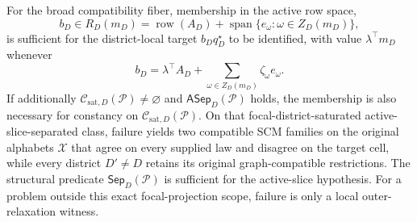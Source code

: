 For the broad compatibility fiber, membership in the active row space,
\[
b_D\in R_D(m_D)
=\operatorname{row}(A_D)+\operatorname{span}\{e_\omega:\omega\in Z_D(m_D)\},
\]
is sufficient for the district-local target \(b_Dq_D^\star\) to be identified, with value \(\lambda^\top m_D\) whenever
\[
b_D=\lambda^\top A_D+\sum_{\omega\in Z_D(m_D)}\zeta_\omega e_\omega.
\]
If additionally \(\mathcal C_{\mathrm{sat},D}(\mathcal P)\ne\varnothing\) and \(\mathsf{ASep}_D(\mathcal P)\) holds, the membership is also necessary for constancy on \(\mathcal C_{\mathrm{sat},D}(\mathcal P)\). On that focal-district-saturated active-slice-separated class, failure yields two compatible SCM families on the original alphabets \(\mathcal X\) that agree on every supplied law and disagree on the target cell, while every district \(D'\ne D\) retains its original graph-compatible restrictions. The structural predicate \(\mathsf{Sep}_D(\mathcal P)\) is sufficient for the active-slice hypothesis. For a problem outside this exact focal-projection scope, failure is only a local outer-relaxation witness.